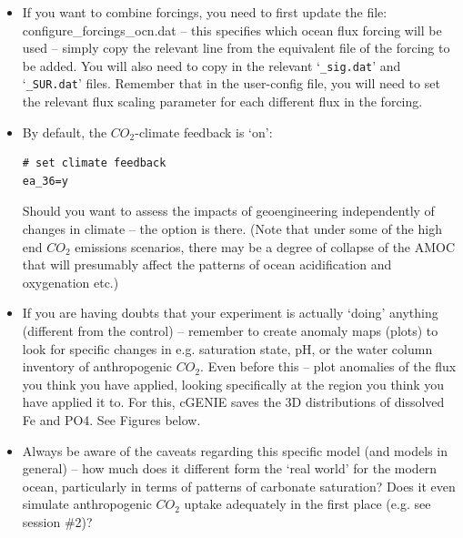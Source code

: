 \documentclass[11pt,fleqn]{book} %
\begin{document}
\begin{itemize}

\item If you want to combine forcings, you need to first update the file: \textsf{\footnotesize configure\_forcings\_ocn.dat} – this specifies which ocean flux forcing will be used – simply copy the relevant line from the equivalent file of the forcing to be added. You will also need to copy in the relevant ‘\texttt{\_sig.dat}’ and ‘\texttt{\_SUR.dat}’ files. Remember that in the user-config file, you will need to set the relevant flux scaling parameter for each different flux in the forcing.

\item By default, the \(CO_{2}\)-climate feedback is ‘on’:
\small\begin{verbatim}
# set climate feedback
ea_36=y
\end{verbatim}\normalsize
Should you want to assess the impacts of geoengineering independently of changes in climate -- the option is there. (Note that under some of the high end \(CO_{2}\) emissions scenarios, there may be a degree of collapse of the AMOC that will presumably affect the patterns of ocean acidification and oxygenation etc.)

\item If you are having doubts that your experiment is actually ‘doing’ anything (different from the control) – remember to create anomaly maps (plots) to look for specific changes in e.g. saturation state, pH, or the water column inventory of anthropogenic \(CO_{2}\). Even before this – plot anomalies of the flux you think you have applied, looking specifically at the region you think you have applied it to. For this, cGENIE saves the 3D distributions of dissolved Fe and PO4. See Figures below.

\item Always be aware of the caveats regarding this specific model (and models in general) – how much does it different form the ‘real world’ for the modern ocean, particularly in terms of patterns of carbonate saturation? Does it even simulate anthropogenic \(CO_{2}\) uptake adequately in the first place (e.g. see session \#2)?

\end{itemize}
\end{document}
